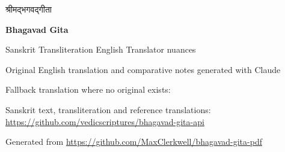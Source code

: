 \begin{titlepage}
  \centering
  \vspace*{30mm}
  {\sanskrit\Huge श्रीमद्भगवद्गीता\par}
  \vspace{6mm}
  {\Huge\bfseries Bhagavad Gita\par}
  \vspace{4mm}
  {\Large Sanskrit \textperiodcentered{} Transliteration \textperiodcentered{} English \textperiodcentered{} Translator nuances\par}
  \vspace{10mm}
  {\large Original English translation and comparative notes generated with Claude\par}
  {\normalsize\color{muted}Fallback translation where no original exists: \translatorname\par}
  \vfill
  {\small\color{muted}
   Sanskrit text, transliteration and reference translations: \url{https://github.com/vedicscriptures/bhagavad-gita-api}\par
   Generated from \url{https://github.com/MaxClerkwell/bhagavad-gita-pdf}\par}
\end{titlepage}

